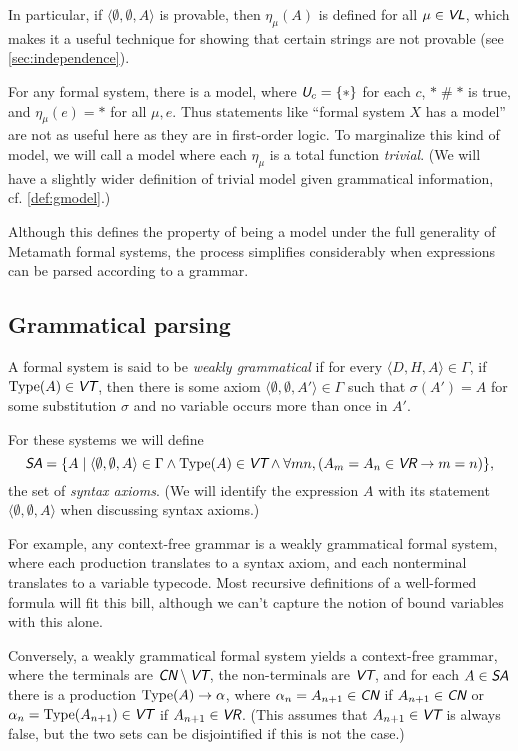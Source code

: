 \documentclass[runningheads,a4paper]{llncs}
\newcommand{\cn}{\textit{\textsf{CN}}} %
\newcommand{\vr}{\textit{\textsf{VR}}} %
\newcommand{\vt}{\textit{\textsf{VT}}} %
\newcommand{\vl}{\textit{\textsf{VL}}} %
\newcommand{\uv}{\textit{\textsf{U}}} %
\newcommand{\sa}{\textit{\textsf{SA}}} %
\newcommand{\ang}[1]{\langle#1\rangle}
\newcommand{\type}{{\rm Type}}
\newcommand{\fresh}{\mathbin{\#}}
\begin{document}
In particular, if $\ang{\emptyset,\emptyset,A}$ is provable, then $\eta_\mu(A)$ is defined for all $\mu\in\vl$, which makes it a useful technique for showing that certain strings are not provable (see \autoref{sec:independence}).

For any formal system, there is a model, where $\uv_c=\{\ast\}$ for each $c$, $\ast\fresh\ast$ is true, and $\eta_\mu(e)=\ast$ for all $\mu,e$. Thus statements like ``formal system $X$ has a model'' are not as useful here as they are in first-order logic. To marginalize this kind of model, we will call a model where each $\eta_\mu$ is a total function {\em trivial}. (We will have a slightly wider definition of trivial model given grammatical information, cf. \autoref{def:gmodel}.)

Although this defines the property of being a model under the full generality of Metamath formal systems, the process simplifies considerably when expressions can be parsed according to a grammar.

\subsection{Grammatical parsing}\label{sec:grammar}
\begin{definition}
A formal system is said to be {\em weakly grammatical} if for every $\ang{D,H,A}\in\Gamma$, if $\type(A)\in\vt$, then there is some axiom $\ang{\emptyset,\emptyset,A'}\in\Gamma$ such that $\sigma(A')=A$ for some substitution $\sigma$ and no variable occurs more than once in $A'$.

For these systems we will define \[\sa=\{A\mid \ang{\emptyset,\emptyset,A}\in\Gamma\land \type(A)\in\vt\land\forall mn,(A_m=A_n\in\vr\to m=n)\},\] the set of {\em syntax axioms}. (We will identify the expression $A$ with its statement $\ang{\emptyset,\emptyset,A}$ when discussing syntax axioms.)
\end{definition}

For example, any context-free grammar is a weakly grammatical formal system, where each production translates to a syntax axiom, and each nonterminal translates to a variable typecode. Most recursive definitions of a well-formed formula will fit this bill, although we can't capture the notion of bound variables with this alone. 

Conversely, a weakly grammatical formal system yields a context-free grammar, where the terminals are $\cn\setminus\vt$, the non-terminals are $\vt$, and for each $A\in\sa$ there is a production $\type(A)\to\alpha$, where $\alpha_n=A_{n+1}\in\cn$ if $A_{n+1}\in\cn$ or  $\alpha_n=\type(A_{n+1})\in\vt$ if $A_{n+1}\in\vr$. (This assumes that $A_{n+1}\in\vt$ is always false, but the two sets can be disjointified if this is not the case.)
\end{document}
